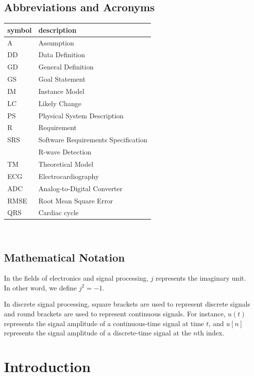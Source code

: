 \documentclass[12pt]{article}
\begin{document}
\subsection{Abbreviations and Acronyms}

\renewcommand{\arraystretch}{1.2}
\begin{tabular}{l l} 
  \toprule		
  \textbf{symbol} & \textbf{description}\\
  \midrule 
  A & Assumption\\
  DD & Data Definition\\
  GD & General Definition\\
  GS & Goal Statement\\
  IM & Instance Model\\
  LC & Likely Change\\
  PS & Physical System Description\\
  R & Requirement\\
  SRS & Software Requirements Specification\\
  \progname{} & R-wave Detection\\
  TM & Theoretical Model\\
  ECG & Electrocardiography\\
  ADC & Analog-to-Digital Converter \\
  RMSE & Root Mean Square Error\\
  QRS & Cardiac cycle \\
  \bottomrule
\end{tabular}\\

\subsection{Mathematical Notation}

In the fields of electronics and signal processing, $j$ represents the imaginary
unit. In other word, we define $j^2 = -1$.

In discrete signal processing, square brackets are used to represent discrete
signals and round brackets are used to represent continuous signals.  For
instance, $u(t)$ represents the signal amplitude of a continuous-time signal at
time $t$, and $u[n]$ represents the signal amplitude of a discrete-time signal
at the $n$th index.

\newpage


\section{Introduction}
\end{document}
